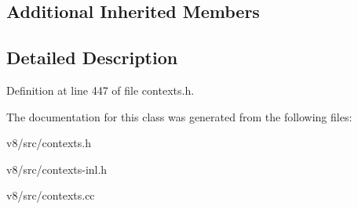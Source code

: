 \subsection*{Additional Inherited Members}


\subsection{Detailed Description}


Definition at line 447 of file contexts.\+h.



The documentation for this class was generated from the following files\+:\begin{DoxyCompactItemize}
\item 
v8/src/contexts.\+h\item 
v8/src/contexts-\/inl.\+h\item 
v8/src/contexts.\+cc\end{DoxyCompactItemize}
